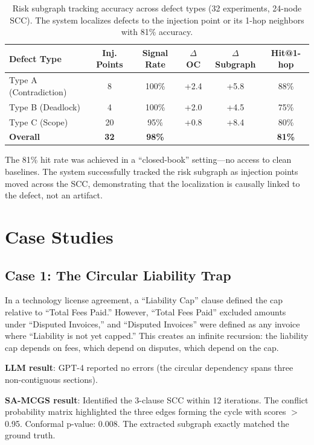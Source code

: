 \documentclass{article}
\begin{document}
\begin{table}[t]
\caption{Risk subgraph tracking accuracy across defect types (32 experiments, 24-node SCC). The system localizes defects to the injection point or its 1-hop neighbors with 81\% accuracy.}
\label{tab:v2}
\centering
\small
\begin{tabular}{lccccc}
\toprule
\textbf{Defect Type} & \textbf{Inj. Points} & \textbf{Signal Rate} & \textbf{$\Delta$ OC} & \textbf{$\Delta$ Subgraph} & \textbf{Hit@1-hop} \\
\midrule
Type A (Contradiction) & 8 & 100\% & +2.4 & +5.8 & 88\% \\
Type B (Deadlock) & 4 & 100\% & +2.0 & +4.5 & 75\% \\
Type C (Scope) & 20 & 95\% & +0.8 & +8.4 & 80\% \\
\midrule
\textbf{Overall} & \textbf{32} & \textbf{98\%} & & & \textbf{81\%} \\
\bottomrule
\end{tabular}
\end{table}

The 81\% hit rate was achieved in a ``closed-book'' setting---no access to clean baselines. The system successfully tracked the risk subgraph as injection points moved across the SCC, demonstrating that the localization is causally linked to the defect, not an artifact.

\section{Case Studies}

\subsection{Case 1: The Circular Liability Trap}
In a technology license agreement, a ``Liability Cap'' clause defined the cap relative to ``Total Fees Paid.'' However, ``Total Fees Paid'' excluded amounts under ``Disputed Invoices,'' and ``Disputed Invoices'' were defined as any invoice where ``Liability is not yet capped.'' This creates an infinite recursion: the liability cap depends on fees, which depend on disputes, which depend on the cap.

\textbf{LLM result}: GPT-4 reported no errors (the circular dependency spans three non-contiguous sections).

\textbf{SA-MCGS result}: Identified the 3-clause SCC within 12 iterations. The conflict probability matrix highlighted the three edges forming the cycle with scores $>$0.95. Conformal p-value: 0.008. The extracted subgraph exactly matched the ground truth.
\end{document}
